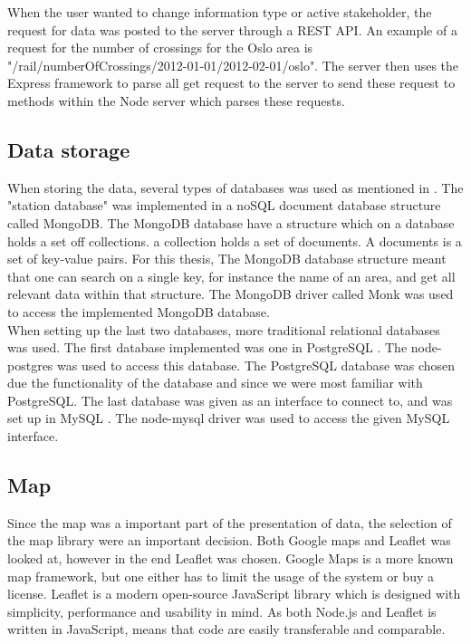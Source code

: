 When the user wanted to change information type or active stakeholder, the
request for data was posted to the server through a REST\cite{REST} API. An
example of a request for the number of crossings for the Oslo area is
"/rail/numberOfCrossings/2012-01-01/2012-02-01/oslo". The server then uses the
Express\cite{express} framework to parse all get request to the server to send
these request to methods within the Node server which parses these requests.



\subsection{Data storage} %
\label{sub:technology_data_storage}
When storing the data, several types of databases was used as mentioned in
. The "station database" was implemented in
a noSQL document database structure called MongoDB\cite{mongoDB}. The MongoDB
database have a structure which on a database holds a set off collections. a
collection holds a set of documents. A documents is a set of key-value pairs.
For this thesis, The MongoDB database structure meant that one can search 
on a single key, for instance the name of an area, and get all relevant data 
within that structure. The MongoDB driver called Monk\cite{npmMonk} was used 
to access the implemented MongoDB database.\\

When setting up the last two databases, more traditional relational databases 
was used. The first database implemented was one in PostgreSQL
\cite{postgreSQLAbout}. The node-postgres\cite{node-postgres} was used to 
access this database. The PostgreSQL database was chosen due the functionality 
of the database and since we were most familiar with PostgreSQL. The 
last database was given as an interface to connect to, and was set up in MySQL
\cite{mySQLAbout}. The node-mysql\cite{node-mysql} driver was used to access 
the given MySQL interface.

\subsection{Map} %
\label{sub:map}
Since the map was a important part of the presentation of data, the selection
of the map library were an important decision. Both Google maps\cite{googleMaps}
and Leaflet\cite{leaflet} was looked at, however in the end Leaflet was 
chosen. Google Maps is a more known map framework, but one either has to limit 
the usage of the system or buy a license. Leaflet is a modern open-source 
JavaScript library which is designed with simplicity, performance and 
usability in mind\cite{leaflet}. As both Node.js and Leaflet is written in 
JavaScript\cite{ wiki:Javascript}, means that code are easily transferable and 
comparable. 



